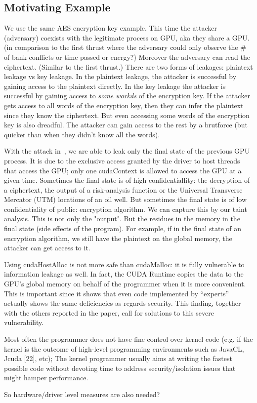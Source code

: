 \subsection{Motivating Example}
We use the same AES encryption key example.
%
This time the attacker (adversary) coexists with the legitimate process on GPU, aka they share a GPU. (in comparison to the first thrust where the adversary could only observe the \# of bank conflicts or time passed or energy?)
%
Moreover the adversary can read the ciphertext. (Similar to the first thrust.)
%
There are two forms of leakages: plaintext leakage vs key leakage.
%
In the plaintext leakage, the attacker is successful by gaining access to the plaintext directly. 
%
In the key leakage the attacker is successful by gaining access to \emph{some workds} of the encryption key. 
%
If the attacker gets access to all words of the encryption key, then they can infer the plaintext since they know the ciphertext.
%
But even accessing some words of the encryption key is also dreadful. 
%
The attacker can gain access to the rest by a brutforce (but quicker than when they didn't know all the words).


With the attack in~\cite{}, we are able to leak only the final state of the previous GPU process. 
%
It is due to the exclusive access granted by the driver to host threads that access the GPU; only one cudaContext is
allowed to access the GPU at a given time.
%
Sometimes the final state is of high confidentiallity: the decryption of a
ciphertext, the output of a risk-analysis function or the Universal Transverse Mercator (UTM) locations of an oil
well.
%
But sometimes the final state is of low confidentiality of public:
encryption algorithm.
%
We can capture this by our taint analysis.
%
This is not only the "output". 
%
But the residues in the memory in the final state (side effects of the program).
%
For example, if in the final state of an encryption algorithm, we still have the plaintext on the global memory, the attacker can get access to it.


Using cudaHostAlloc is not more safe than cudaMalloc: it is fully vulnerable to information leakage as well.
In fact, the CUDA Runtime copies the data to the GPU’s global memory on behalf of the programmer when it
is more convenient.
This is important since it shows that even code implemented by “experts” actually shows the
same deficiencies as regards security. This finding, together with the others reported in the paper, call for solutions
to this severe vulnerability.


Most often the programmer does not have fine control over kernel code (e.g. if the kernel is the outcome of
high-level programming environments such as JavaCL, Jcuda [22], etc);
The kernel programmer usually aims at writing the fastest possible code without devoting time to address
security/isolation issues that might hamper performance.

So hardware/driver level measures are also needed?




